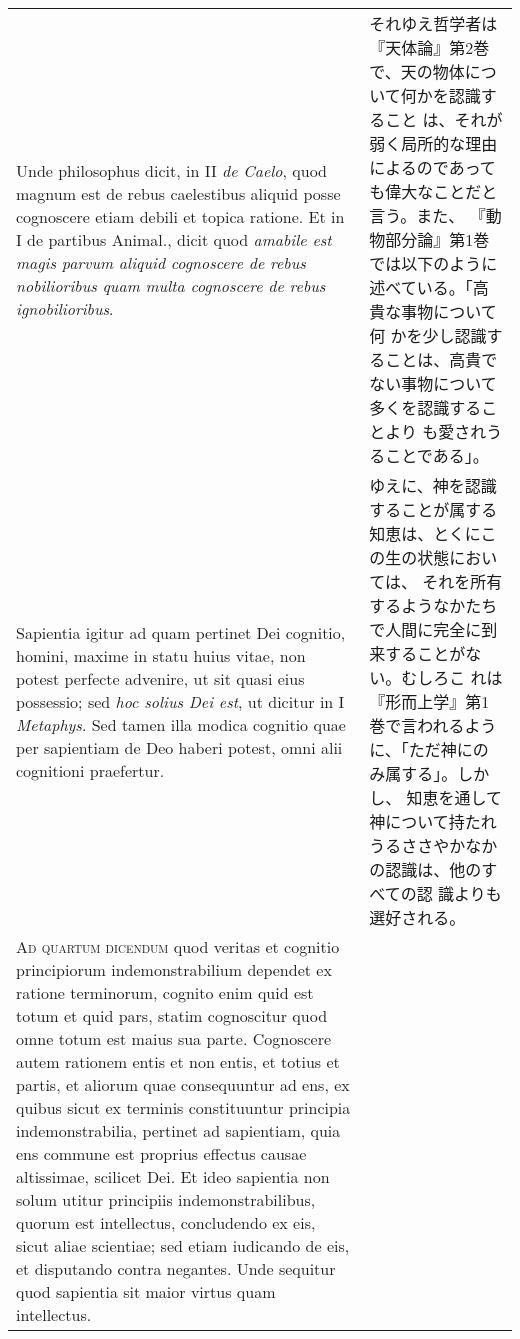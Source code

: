 \documentclass[10pt]{jsarticle}
\begin{document}
\begin{longtable}{p{21em}p{21em}}
\\



 Unde philosophus dicit, in II {\itshape de Caelo}, quod magnum est de
rebus caelestibus aliquid posse cognoscere etiam debili et topica
ratione. Et in I de partibus Animal., dicit quod {\itshape amabile est
magis parvum aliquid cognoscere de rebus nobilioribus quam multa
cognoscere de rebus ignobilioribus}.


&

 それゆえ哲学者は『天体論』第2巻で、天の物体について何かを認識すること
 は、それが弱く局所的な理由によるのであっても偉大なことだと言う。また、
 『動物部分論』第1巻では以下のように述べている。「高貴な事物について何
 かを少し認識することは、高貴でない事物について多くを認識することより
 も愛されうることである」。

\\

 Sapientia igitur ad quam pertinet Dei cognitio, homini, maxime in
statu huius vitae, non potest perfecte advenire, ut sit quasi eius
possessio; sed {\itshape hoc solius Dei est}, ut dicitur in I
{\itshape Metaphys}. Sed tamen illa modica cognitio quae per
sapientiam de Deo haberi potest, omni alii cognitioni praefertur.

&

 ゆえに、神を認識することが属する知恵は、とくにこの生の状態においては、
 それを所有するようなかたちで人間に完全に到来することがない。むしろこ
 れは『形而上学』第1巻で言われるように、「ただ神にのみ属する」。しかし、
 知恵を通して神について持たれうるささやかなかの認識は、他のすべての認
 識よりも選好される。

\\




{\scshape Ad quartum dicendum} quod veritas et cognitio principiorum
indemonstrabilium dependet ex ratione terminorum, cognito enim quid
est totum et quid pars, statim cognoscitur quod omne totum est maius
sua parte. Cognoscere autem rationem entis et non entis, et totius et
partis, et aliorum quae consequuntur ad ens, ex quibus sicut ex
terminis constituuntur principia indemonstrabilia, pertinet ad
sapientiam, quia ens commune est proprius effectus causae altissimae,
scilicet Dei. Et ideo sapientia non solum utitur principiis
indemonstrabilibus, quorum est intellectus, concludendo ex eis, sicut
aliae scientiae; sed etiam iudicando de eis, et disputando contra
negantes. Unde sequitur quod sapientia sit maior virtus quam
intellectus.



\end{longtable}
\end{document}

